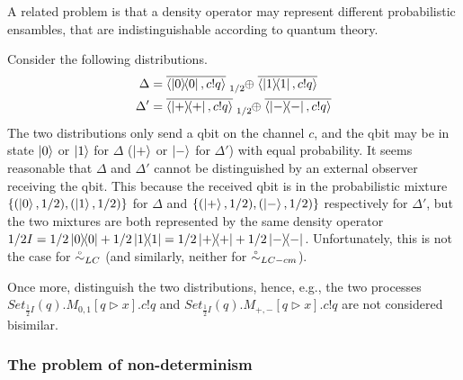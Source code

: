A related problem is that a density operator may represent different probabilistic ensambles, that are indistinguishable according to quantum theory.
\begin{example}
	Consider the following distributions.
	\begin{align*}
		\Delta &= \overline{\confw{\ketbra{0}{0}, c!q}} \psum{1/2} \overline{\confw{\ketbra{1}{1}, c!q}}\\
		\Delta' &= \overline{\confw{\ketbra{+}{+}, c!q}} \psum{1/2} \overline{\confw{\ketbra{-}{-}, c!q}}
	\end{align*}
	The two distributions only send a qbit on the channel $c$, and the qbit may be in state $\ket{0}$ or $\ket{1}$ for $\Delta$ ($\ket{+}$ or $\ket{-}$ for $\Delta'$) with equal probability.
	It seems reasonable that $\Delta$ and $\Delta'$ cannot be distinguished by an external observer receiving the qbit.
	This because the received qbit is in the probabilistic mixture $\{(\ket{0}, 1/2), (\ket{1}, 1/2)\}$ for $\Delta$ and $\{(\ket{+}, 1/2), (\ket{-}, 1/2)\}$ respectively for $\Delta'$, but the two mixtures are both represented by the same density operator $1/2 I = 1/2 \ketbra{0}{0} + 1/2 \ketbra{1}{1} = 1/2 \ketbra{+}{+} + 1/2 \ketbra{-}{-}$.
	Unfortunately, this is not the case for $\stackrel{\scriptscriptstyle \circ}{\sim}_{LC}$ (and similarly, neither for $\stackrel{\scriptscriptstyle \circ}{\sim}_{LC-cm}$).
\end{example}
Once more, \cite{Feng:2012, Deng:2012} distinguish the two distributions, hence, e.g., the two processes $Set_{\frac{1}{2} I}(q).M_{0,1}[q \triangleright x].c!q$ and $Set_{\frac{1}{2} I}(q).M_{+,-}[q \triangleright x].c!q$ are not considered bisimilar.

\subsubsection*{The problem of non-determinism}

